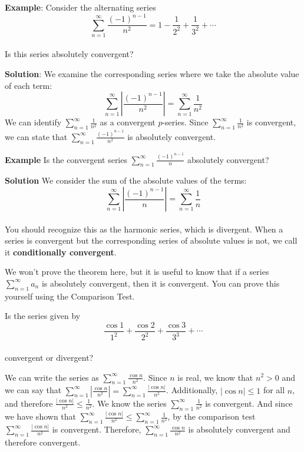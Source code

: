 \textbf{Example}: Consider the alternating series 
$$\sum_{n=1}^\infty \frac{(-1)^{n-1}}{n^2} = 1 - \frac{1}{2^2} + 
\frac{1}{3^2} + \cdots$$\\
Is this series absolutely convergent?

\textbf{Solution}: We examine the corresponding series where we take the 
absolute value of each term:
$$\sum_{n=1}^\infty \left|\frac{(-1)^{n-1}}{n^2} \right| = \sum_{n=1}^
\infty \frac{1}{n^2}$$
We can identify $\sum_{n=1}^\infty \frac{1}{n^2}$ as a convergent $p$-series. 
Since $\sum_{n=1}^\infty \frac{1}{n^2}$ is convergent, we can state that 
$\sum_{n=1}^\infty \frac{(-1)^{n-1}}{n^2}$ is absolutely convergent. 

\textbf{Example} Is the convergent series $\sum_{n=1}^\infty 
\frac{(-1)^{n-1}}{n}$ absolutely convergent?

\textbf{Solution} We consider the sum of the absolute values of the terms:
$$\sum_{n=1}^\infty \left|\frac{(-1)^{n-1}}{n}\right| = \sum_{n=1}^\infty 
\frac{1}{n}$$\\
You should recognize this as the harmonic series, which is divergent. When a 
series is convergent but the corresponding series of absolute values is not, 
we call it \textbf{conditionally convergent}. 

We won't prove the theorem here, but it is useful to know that if a series 
$\sum_{n=1}^\infty a_n$ is absolutely convergent, then it is convergent. You 
can prove this yourself using the Comparison Test. 

\begin{Exercise}[label = absconv1]
Is the series given by 
$$\frac{\cos{1}}{1^2} + \frac{\cos{2}}{2^2} + \frac{\cos{3}}{3^3} + \cdots$$ \\
convergent or divergent?
\vspace{40mm}
\end{Exercise}

\begin{Answer}[ref = absconv1]
We can write the series as $\sum_{n=1}^\infty \frac{\cos{n}}{n^2}$. Since 
$n$ is real, we know that $n^2 > 0$ and we can say that $\sum_{n=1}^\infty 
\left| \frac{\cos{n}}{n^2} \right| = \sum_{n=1}^\infty \frac{|\cos{n}|}
{n^2}$. Additionally, $|\cos{n}| \leq 1$ for all $n$, and therefore 
$\frac{|\cos{n}|}{n^2} \leq \frac{1}{n^2}$. We know the series $\sum_{n=1}^
\infty \frac{1}{n^2}$ is convergent. And since we have shown that $\sum_{n=1}
^\infty \frac{|\cos{n}|}{n^2} \leq \sum_{n=1}^\infty \frac{1}{n^2}$, by the 
comparison test $\sum_{n=1}^\infty \frac{|\cos{n}|}{n^2}$ is convergent. 
Therefore, $\sum_{n=1}^\infty \frac{\cos{n}}{n^2}$ is absolutely convergent 
and therefore convergent. 
\end{Answer}

